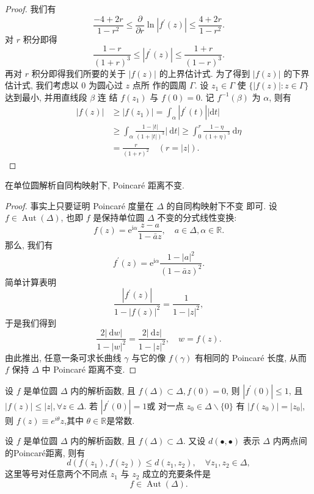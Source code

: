 \begin{proof}
我们有
$$
\frac{-4+2 r}{1-r^2} \leqslant \frac{\partial}{\partial r} \ln \left|f^{\prime}(z)\right| \leqslant \frac{4+2 r}{1-r^2} .
$$
对 $r$ 积分即得
$$
\frac{1-r}{(1+r)^3} \leqslant\left|f^{\prime}(z)\right| \leqslant \frac{1+r}{(1-r)^3} .
$$
再对 $r$ 积分即得我们所要的关于 $|f(z)|$ 的上界估计式.
为了得到 $|f(z)|$ 的下界估计式, 我们考虑以 0 为圆心过 $z$ 点所 作的圆周 $\Gamma$. 设 $z_1 \in \Gamma$ 使 $\{|f(z)|: z \in \Gamma\}$ 达到最小, 并用直线段 $\beta$ 连 结 $f\left(z_1\right)$ 与 $f(0)=0$. 记 $f^{-1}(\beta)$ 为 $\alpha$, 则有
$$
\begin{aligned}
|f(z)| & \geqslant\left|f\left(z_1\right)\right|=\int_\alpha\left|f^{\prime}(t)\right||\mathrm{d} t| \\
& \geqslant \int_\alpha \frac{1-|t|}{(1+|t|)^3}|\mathrm{~d} t| \geqslant \int_0^r \frac{1-\eta}{(1+\eta)^3} \mathrm{~d} \eta \\
& =\frac{r}{(1+r)^2} \quad(r=|z|) .
\end{aligned}
$$
\end{proof}
\begin{prop}
    在单位圆解析自同构映射下, Poincar\'{e} 距离不变.
\end{prop}
\begin{proof}
    事实上只要证明 Poincaré 度量在 $\Delta$ 的自同构映射下不变 即可.
设 $f \in \operatorname{Aut}(\Delta)$, 也即 $f$ 是保持单位圆 $\Delta$ 不变的分式线性变换:
$$
f(z)=\mathrm{e}^{\mathrm{i} \alpha} \frac{z-a}{1-\bar{a} z}, \quad a \in \Delta, \alpha \in \mathbb{R} .
$$
那么, 我们有
$$
f^{\prime}(z)=\mathrm{e}^{\mathrm{i} \alpha} \frac{1-|a|^2}{(1-\bar{a} z)^2} .
$$
简单计算表明
$$
\frac{\left|f^{\prime}(z)\right|}{1-|f(z)|^2}=\frac{1}{1-|z|^2},
$$
于是我们得到
$$
\frac{2|\mathrm{~d} w|}{1-|w|^2}=\frac{2|\mathrm{~d} z|}{1-|z|^2}, \quad w=f(z) .
$$
由此推出, 任意一条可求长曲线 $\gamma$ 与它的像 $f(\gamma)$ 有相同的 Poincaré 长度, 从而 $f$ 保持 $\Delta$ 中 Poincaré 距离不变.
\end{proof}
\begin{thm}[Schwarz 引理] \label{thm: Schwarz lem}
    设 $f$ 是单位圆 $\Delta$ 内的解析函数, 且 $f(\Delta)\subset \Delta, f(0)=0$, 则 $|f^\prime (0)|\leqslant 1$, 且 $|f(z)|\leqslant |z|,\forall z\in \Delta$. 若 $|f^\prime (0)|=1$或 对一点 $z_0\in \Delta\backslash \{0\}$ 有 $|f(z_0)|=|z_0|$, 则 $f(z)\equiv e^{i\theta}z$,其中 $\theta\in \mathbb{R}$是常数.
\end{thm}
\begin{thm}\label{thm: Schwarz - pick thm}
    设 $f$ 是单位圆 $\Delta$ 内的解析函数, 且 $f(\Delta)\subset \Delta$. 又设 $d(\bullet,\bullet)$ 表示 $\Delta$ 内两点间的Poincar\'{e}距离, 则有
    \[d(f(z_1),f(z_2))\leqslant d(z_1,z_2),\quad\forall z_1,z_2\in \Delta,\]
    这里等号对任意两个不同点 $z_1$ 与 $z_2$ 成立的充要条件是
    \[f\in \operatorname{Aut} (\Delta).\]
\end{thm}
